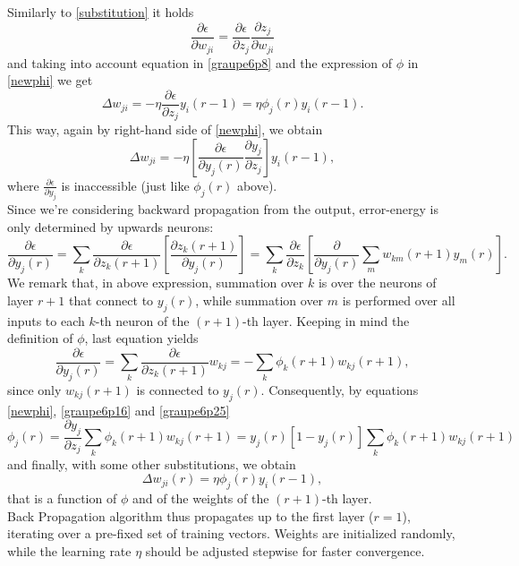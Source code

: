 \documentclass[%
    corpo=11pt,
    twoside,
    stile=classica,
    oldstyle,
    autoretitolo,
    tipotesi=magistrale,
    greek,
    evenboxes,
    english
]{toptesi}
\begin{document}
Similarly to \eqref{substitution} it holds
\begin{equation}
\frac{\partial \epsilon}{\partial w_{ji}} = \frac{\partial \epsilon}{\partial z_j} \frac{\partial z_j}{\partial w_{ji}}
\end{equation}
and taking into account equation in \eqref{graupe6p8} and the expression of $\phi$ in \eqref{newphi} we get
\begin{equation}
\Delta w_{ji} = -\eta \frac{\partial \epsilon}{\partial z_j} y_i (r-1) = \eta \phi_j(r)y_i(r-1).
\end{equation}
This way, again by right-hand side of \eqref{newphi}, we obtain
\begin{equation}
\Delta w_{ji} = -\eta \left[ \frac{\partial \epsilon}{\partial y_j (r)} \frac{\partial y_j}{\partial z_j} \right]y_i(r-1),
\end{equation}
where $\frac{\partial \epsilon}{\partial y_j}$ is inaccessible (just like $\phi_j (r)$ above). \\
Since we're considering backward propagation from the output, error-energy is only determined by upwards neurons:
\begin{equation}
\frac{\partial \epsilon}{\partial y_j (r)} = \sum_k \frac{\partial \epsilon}{\partial z_k (r+1)} \left[\frac{\partial z_k (r+1)}{\partial y_j (r)} \right] = \sum_k \frac{\partial \epsilon}{\partial z_k} \left[ \frac{\partial}{\partial y_j(r)} \sum_m w_{km}(r+1)y_m(r)\right].
\end{equation}
We remark that, in above expression, summation over $k$ is over the neurons of layer $r+1$ that connect to $y_j(r)$, while summation over $m$ is performed over all inputs to each $k$-th neuron of the $(r+1)$-th layer. Keeping in mind the definition of $\phi$, last equation yields
\begin{equation} 
\label{graupe6p25}
\frac{\partial \epsilon}{\partial y_j (r)}  = \sum_k \frac{\partial \epsilon}{\partial z_k (r+1)}w_{kj} = - \sum_k \phi_k(r+1)w_{kj}(r+1),
\end{equation}
since only $w_{kj}(r+1)$ is connected to $y_j(r)$. Consequently, by equations \eqref{newphi}, \eqref{graupe6p16} and \eqref{graupe6p25}
\begin{equation}
\phi_j(r) = \frac{\partial y_j}{\partial z_j}\sum_k \phi_k(r+1)w_{kj}(r +1) = y_j(r)\left[1 -y_j(r)\right]\sum_k \phi_k(r+1)w_{kj}(r +1)
\end{equation}
and finally, with some other substitutions, we obtain
\begin{equation}
\Delta w_{ji}(r) = \eta \phi_j(r)y_i(r-1),
\end{equation}
that is a function of $\phi$ and of the weights of the $(r + 1)$-th layer. \\
Back Propagation algorithm thus propagates up to the first layer ($r = 1$), iterating over a pre-fixed set of training vectors. Weights are initialized randomly, while the learning rate $\eta$ should be adjusted stepwise for faster convergence.
\end{document}
